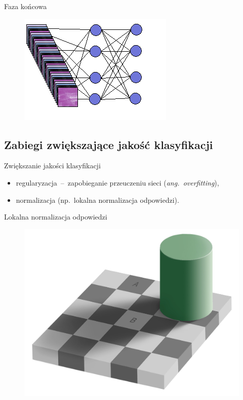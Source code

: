 \documentclass[xcolor=dvipsnames]{beamer}
\begin{document}
\begin{frame}{Faza końcowa}
	\begin{figure}
		\includegraphics[width=\linewidth, height=0.7\textheight, keepaspectratio] {img/fully_connected_layer.png}
	\end{figure}
\end{frame}


\subsection{Zabiegi zwiększające jakość klasyfikacji}
\begin{frame}{Zwiększanie jakości klasyfikacji}
    \begin{itemize}
        \item regularyzacja~--~zapobieganie przeuczeniu sieci (\textit{ang.~overfitting}),
        \item normalizacja (np.~lokalna normalizacja odpowiedzi).
    \end{itemize}
\end{frame}
\begin{frame}{Lokalna normalizacja odpowiedzi}
    \begin{figure}
		\includegraphics[width=\linewidth, height=0.7\textheight, keepaspectratio] {img/chess-illusion.png}
	\end{figure}
\end{frame}
\end{document}
